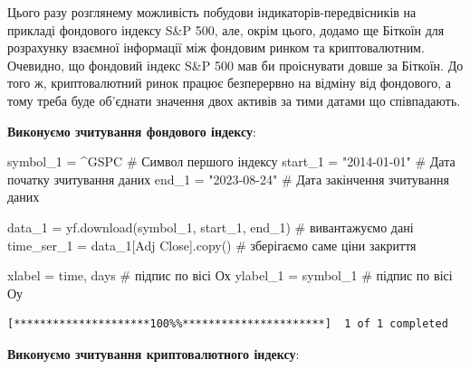 \documentclass[
  letterpaper,
]{report}
\newenvironment{Shaded}{\begin{snugshade}}{\end{snugshade}}
\newcommand{\CommentTok}[1]{\textcolor[rgb]{0.37,0.37,0.37}{#1}}
\newcommand{\NormalTok}[1]{\textcolor[rgb]{0.00,0.23,0.31}{#1}}
\newcommand{\OperatorTok}[1]{\textcolor[rgb]{0.37,0.37,0.37}{#1}}
\newcommand{\StringTok}[1]{\textcolor[rgb]{0.13,0.47,0.30}{#1}}
\begin{document}
Цього разу розглянему можливість побудови індикаторів-передвісників на
прикладі фондового індексу S\&P 500, але, окрім цього, додамо ще Біткоїн
для розрахунку взаємної інформації між фондовим ринком та
криптовалютним. Очевидно, що фондовий індекс S\&P 500 мав би проіснувати
довше за Біткоїн. До того ж, криптовалютний ринок працює безперервно на
відміну від фондового, а тому треба буде об'єднати значення двох активів
за тими датами що співпадають.

\textbf{Виконуємо зчитування фондового індексу}:

\begin{Shaded}
\begin{Highlighting}[]
\NormalTok{symbol\_1 }\OperatorTok{=} \StringTok{\textquotesingle{}\^{}GSPC\textquotesingle{}}         \CommentTok{\# Символ першого індексу}
\NormalTok{start\_1 }\OperatorTok{=} \StringTok{"2014{-}01{-}01"}     \CommentTok{\# Дата початку зчитування даних}
\NormalTok{end\_1 }\OperatorTok{=} \StringTok{"2023{-}08{-}24"}       \CommentTok{\# Дата закінчення зчитування даних}

\NormalTok{data\_1 }\OperatorTok{=}\NormalTok{ yf.download(symbol\_1, start\_1, end\_1)  }\CommentTok{\# вивантажуємо дані}
\NormalTok{time\_ser\_1 }\OperatorTok{=}\NormalTok{ data\_1[}\StringTok{\textquotesingle{}Adj Close\textquotesingle{}}\NormalTok{].copy()         }\CommentTok{\# зберігаємо саме ціни закриття}

\NormalTok{xlabel }\OperatorTok{=} \StringTok{\textquotesingle{}time, days\textquotesingle{}}      \CommentTok{\# підпис по вісі Ох }
\NormalTok{ylabel\_1 }\OperatorTok{=}\NormalTok{ symbol\_1        }\CommentTok{\# підпис по вісі Оу}
\end{Highlighting}
\end{Shaded}

\begin{verbatim}
[*********************100%%**********************]  1 of 1 completed
\end{verbatim}

\textbf{Виконуємо зчитування криптовалютного індексу}:
\end{document}
